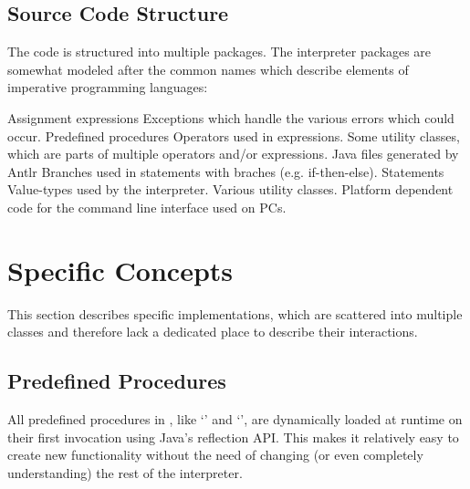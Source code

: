 \subsection{Source Code Structure}\label{srcStructure}

The code is structured into multiple packages. The interpreter packages are somewhat modeled after the common names which describe elements of imperative programming languages:

\begin{itemize}
            {Assignment expressions}
            {Exceptions which handle the various errors which could occur.}
            {Predefined procedures}
            {Operators used in expressions.}
            {Some utility classes, which are parts of multiple operators and\slash{}or expressions.}
            {Java files generated by Antlr}
            {Branches used in statements with braches (e.g. if-then-else).}
            {Statements}
            {Value-types used by the interpreter.}
            {Various utility classes.}
            {Platform dependent code for the command line interface used on PCs.}
\end{itemize}

\section{Specific Concepts}\label{specificConcepts}

This section describes specific implementations, which are scattered into multiple classes and therefore lack a dedicated place to describe their interactions.

\subsection{Predefined Procedures}

All predefined procedures in \setlX{}, like `' and `', are dynamically loaded at runtime on their first invocation using Java's reflection API. This makes it relatively easy to create new functionality without the need of changing (or even completely understanding) the rest of the interpreter.

